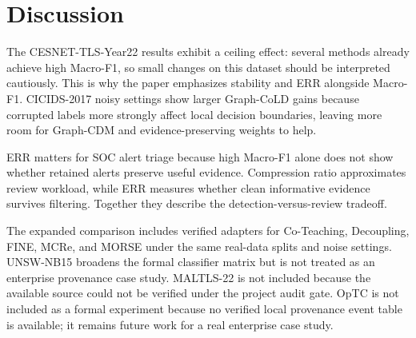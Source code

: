 \section{Discussion}
The CESNET-TLS-Year22 results exhibit a ceiling effect: several methods already achieve high Macro-F1, so small changes on this dataset should be interpreted cautiously. This is why the paper emphasizes stability and ERR alongside Macro-F1. CICIDS-2017 noisy settings show larger Graph-CoLD gains because corrupted labels more strongly affect local decision boundaries, leaving more room for Graph-CDM and evidence-preserving weights to help.

ERR matters for SOC alert triage because high Macro-F1 alone does not show whether retained alerts preserve useful evidence. Compression ratio approximates review workload, while ERR measures whether clean informative evidence survives filtering. Together they describe the detection-versus-review tradeoff.

The expanded comparison includes verified adapters for Co-Teaching, Decoupling, FINE, MCRe, and MORSE under the same real-data splits and noise settings. UNSW-NB15 broadens the formal classifier matrix but is not treated as an enterprise provenance case study. MALTLS-22 is not included because the available source could not be verified under the project audit gate. OpTC is not included as a formal experiment because no verified local provenance event table is available; it remains future work for a real enterprise case study.
